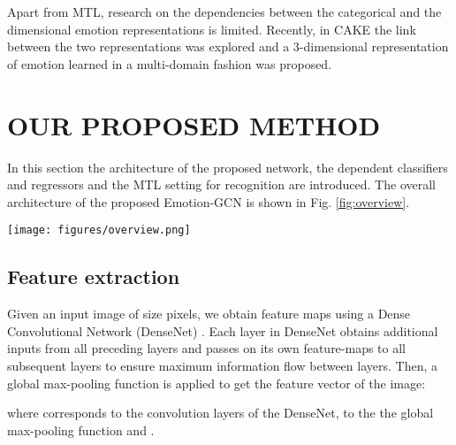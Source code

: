 \documentclass[a4paper, 10pt, conference]{ieeeconf}      \usepackage{FG2021}
\begin{document}
Apart from MTL, research on the dependencies between the categorical and the dimensional emotion representations is limited. Recently, in CAKE \cite{kervadec2018cake} the link between the two representations was explored and a 3-dimensional representation of emotion learned in a multi-domain fashion was proposed.

\section{OUR PROPOSED METHOD}
\label{sec:proposed_method}

In this section the architecture of the proposed network, the dependent classifiers and regressors and the MTL setting for recognition are introduced. The overall architecture of the proposed Emotion-GCN is shown in Fig. \ref{fig:overview}.

\begin{figure*}[t]
    \centering
    \texttt{[image: figures/overview.png]}
    \caption{Overall architecture of our Emotion-GCN model for FER in the wild. Our graph contains the seven expression labels and the two VA dimensions that are connected to each other based on the adjacency matrix . Stacked GCNs are learned over the graph to map the word embeddings of the nodes  into a set of dependent classifiers and regressors,  and  respectively. These vectors are then applied to an image representation  extracted from the input image  via a DenseNet  followed by a global max-pooling function . The whole network is trained end-to-end for both basic expression classification () and VA regression ().}
    \label{fig:overview}
\end{figure*}

\subsection{Feature extraction}

Given an input image  of size  pixels, we obtain  feature maps using a Dense Convolutional Network (DenseNet) \cite{huang2017densely}. Each layer in DenseNet obtains additional inputs from all preceding layers and passes on its own feature-maps to all subsequent layers to ensure maximum information flow between layers. Then, a global max-pooling function is applied to get the feature vector  of the image:

where  corresponds to the convolution layers of the DenseNet,  to the the global max-pooling function and .
\end{document}
